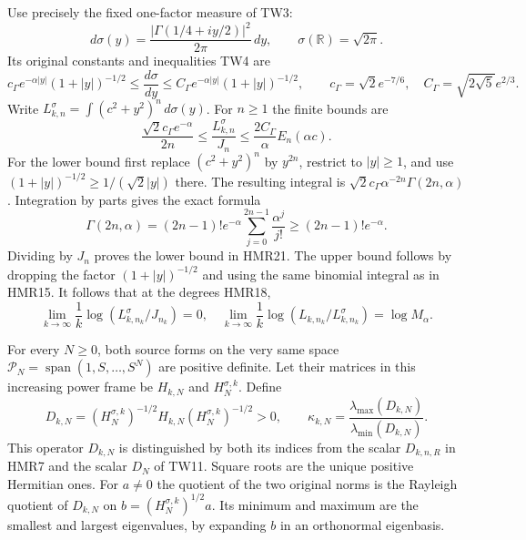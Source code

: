 Use precisely the fixed one-factor measure of TW3:
\[
 d\sigma(y)=\frac{|\Gamma(1/4+iy/2)|^2}{2\pi}\,dy,\qquad
 \sigma(\mathbb R)=\sqrt{2\pi}.
 \tag{HMR19}
\]
Its original constants and inequalities TW4 are
\[
 c_\Gamma e^{-\alpha|y|}(1+|y|)^{-1/2}
 \leq\frac{d\sigma}{dy}
 \leq C_\Gamma e^{-\alpha|y|}(1+|y|)^{-1/2},\qquad
 c_\Gamma=\sqrt2e^{-7/6},\quad
 C_\Gamma=\sqrt{2\sqrt5}e^{2/3}.
 \tag{HMR20}
\]
Write $L^\sigma_{k,n}=\int(c^2+y^2)^n\,d\sigma(y)$.
For $n\geq1$ the finite bounds are
\[
 \frac{\sqrt2c_\Gamma e^{-\alpha}}{2n}
 \leq\frac{L^\sigma_{k,n}}{J_n}
 \leq\frac{2C_\Gamma}{\alpha}E_n(\alpha c).
 \tag{HMR21}
\]
For the lower bound first replace $(c^2+y^2)^n$ by
$y^{2n}$, restrict to $|y|\geq1$, and use
$(1+|y|)^{-1/2}\geq1/(\sqrt2|y|)$ there.
The resulting integral is
$\sqrt2c_\Gamma\alpha^{-2n}\Gamma(2n,\alpha)$.
Integration by parts gives the exact formula
\[
 \Gamma(2n,\alpha)=(2n-1)!e^{-\alpha}
              \sum_{j=0}^{2n-1}\frac{\alpha^j}{j!}
 \geq(2n-1)!e^{-\alpha}.
\]
Dividing by $J_n$ proves the lower bound in HMR21.
The upper bound follows by dropping the factor
$(1+|y|)^{-1/2}$ and using the same binomial integral
as in HMR15. It follows that at the degrees HMR18,
\[
 \lim_{k\to\infty}\frac1k\log(L^\sigma_{k,n_k}/J_{n_k})=0,
 \quad
 \lim_{k\to\infty}\frac1k\log(L_{k,n_k}/L^\sigma_{k,n_k})
 =\log M_\alpha .
 \tag{HMR22}
\]

For every $N\geq0$, both source forms on the very same
space $\mathcal P_N=\operatorname{span}(1,S,\ldots,S^N)$
are positive definite. Let their matrices in this increasing
power frame be $H_{k,N}$ and $H^{\sigma,k}_N$. Define
\[
 D_{k,N}=(H^{\sigma,k}_N)^{-1/2}
              H_{k,N}(H^{\sigma,k}_N)^{-1/2}>0,\qquad
 \kappa_{k,N}=
       \frac{\lambda_{\max}(D_{k,N})}{\lambda_{\min}(D_{k,N})}.
 \tag{HMR23}
\]
This operator $D_{k,N}$ is distinguished by both its indices
from the scalar $D_{k,n,R}$ in HMR7 and the scalar $D_N$ of
TW11. Square roots are the unique positive Hermitian ones.
For $a\ne0$ the quotient of the two original norms is the
Rayleigh quotient of $D_{k,N}$ on
$b=(H^{\sigma,k}_N)^{1/2}a$. Its minimum and maximum
are the smallest and largest eigenvalues, by expanding
$b$ in an orthonormal eigenbasis.

